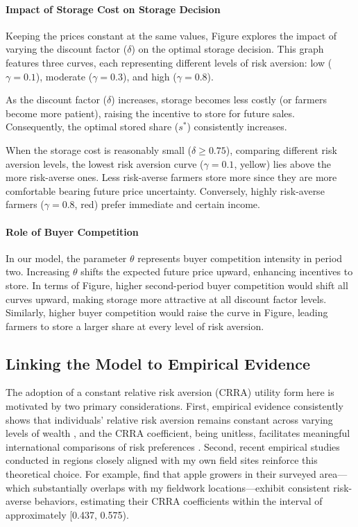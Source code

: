 \documentclass[12pt]{article}
\begin{document}
\paragraph{Impact of Storage Cost on Storage Decision}
Keeping the prices constant at the same values, Figure explores the impact of varying the discount factor (\( \delta \)) on the optimal storage decision. This graph features three curves, each representing different levels of risk aversion: low ($\gamma=0.1$), moderate ($\gamma=0.3$), and high ($\gamma=0.8$).

As the discount factor ($\delta$) increases, storage becomes less costly (or farmers become more patient), raising the incentive to store for future sales. Consequently, the optimal stored share ($s^*$) consistently increases. 

When the storage cost is reasonably small ($\delta \ge 0.75$), comparing different risk aversion levels, the lowest risk aversion curve ($\gamma=0.1$, yellow) lies above the more risk-averse ones. Less risk-averse farmers store more since they are more comfortable bearing future price uncertainty. Conversely, highly risk-averse farmers ($\gamma=0.8$, red) prefer immediate and certain income.


\paragraph{Role of Buyer Competition}
In our model, the parameter $\theta$ represents buyer competition intensity in period two. Increasing $\theta$ shifts the expected future price upward, enhancing incentives to store. In terms of Figure, higher second-period buyer competition would shift all curves upward, making storage more attractive at all discount factor levels. Similarly, higher buyer competition would raise the curve in Figure, leading farmers to store a larger share at every level of risk aversion.




\subsection{Linking the Model to Empirical Evidence}
The adoption of a constant relative risk aversion (CRRA) utility form here is motivated by two primary considerations. First, empirical evidence consistently shows that individuals' relative risk aversion remains constant across varying levels of wealth \citep{chiappori2011relative}, and the CRRA coefficient, being unitless, facilitates meaningful international comparisons of risk preferences \citep{hardaker2000some}. Second, recent empirical studies conducted in regions closely aligned with my own field sites reinforce this theoretical choice. For example, \cite{jin2024losses} find that apple growers in their surveyed area—which substantially overlaps with my fieldwork locations—exhibit consistent risk-averse behaviors, estimating their CRRA coefficients within the interval of approximately [0.437, 0.575).
\end{document}
